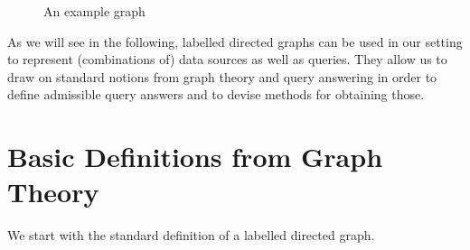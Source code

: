 \begin{figure}
  \caption{An example graph}
  \label{fig:example_graph}
\end{figure}

As we will see in the following, labelled directed graphs can be used in our setting
to represent (combinations of) data sources as well as queries.
They allow us to draw on standard notions from graph theory and query answering
in order to define admissible query answers and to devise methods for obtaining those.

\section{Basic Definitions from Graph Theory}

We start with the standard definition of a labelled directed graph.

